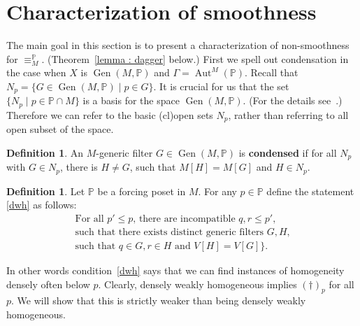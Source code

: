 \documentclass{amsart}
\newcommand{\markdef}[1]{\textbf{#1}}
\newcommand{\Gen}{\operatorname{Gen}}
\DeclareMathOperator{\Aut}{Aut}
\theoremstyle{definition}
\newtheorem{definition}[theorem]{Definition}
\theoremstyle{remark}
\begin{document}
\section{Characterization of smoothness}
\label{sec : smoothness}

The main goal in this section is to present a characterization of non-smoothness for \(\equiv_{M}^\mathbb{P}\). (Theorem~\ref{lemma : dagger} below.)
First we spell out condensation in the case when $X$ is $\Gen(M, \mathbb{P})$ and \(\Gamma=\Aut^M(\mathbb{P})\).
Recall that \(N_p=\{G\in \Gen(M, \mathbb{P})\mid p\in G\}\). It is crucial for us that the set \(\{N_p \mid p\in \mathbb{P}\cap M\}\) is a basis for the space \(\Gen(M,\mathbb{P})\). (For the details see~\cite[Lemma~2.3]{Smy22}.) Therefore we can refer to the basic (cl)open sets \(N_p\), rather than referring to all open subset of the space.

\begin{definition}
\label{def : condensed filter}
An \(M\)-generic filter $G\in \Gen(M, \mathbb{P})$ is \markdef{condensed} if for all $N_p$ with $G\in N_p$, there is $H\neq G$, such that $M[H]=M[G]$ and $H\in N_p$. 
\end{definition}




\begin{definition} Let \(\mathbb{P}\) be a forcing poset in \(M\). For any \(p\in \mathbb{P}\) define the statement \eqref{dwh} as follows:
\begin{multline}\tag{$\dagger_p$}\label{dwh}
\text{For all $p'\leq p$, there are incompatible $q,r\leq p'$,}\\
\text{such that there exists distinct generic filters $G,H$,}\\
\text{such that $q\in G, r\in H$ and $V[H]=V[G]$\}.}
\end{multline}
\end{definition}

In other words condition~\eqref{dwh} says that we can find instances of homogeneity densely often below $p$. Clearly, densely weakly homogeneous implies  $(\dagger)_p$ for all $p$.
We will show that this is strictly weaker than being densely weakly homogeneous.
\end{document}
